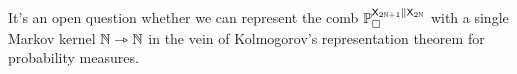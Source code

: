 It's an open question whether we can represent the comb $\mathbb{P}_\square^{\mathsf{X}_{2\mathbb{N}+1}\|\mathsf{X}_{2\mathbb{N}}}$ with a single Markov kernel $\mathbb{N}\rightarrowtriangle \mathbb{N}$ in the vein of Kolmogorov's representation theorem for probability measures.













